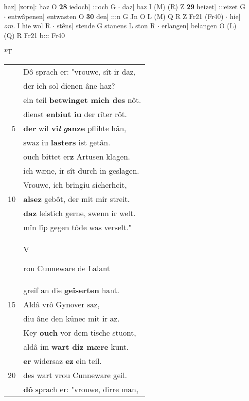 \documentclass[8pt,a4paper,notitlepage]{article}
\begin{document}
\begin{table}[ht]
\begin{minipage}[t]{0.5\linewidth}
haz] [zorn]: haz O \textbf{28} iedoch] :::och G  $\cdot$ daz] baz I (M) (R) Z \textbf{29} heizet] :::eizet G  $\cdot$ entwâpenen] entwasten O \textbf{30} den] :::n G Jn O L (M) Q R Z Fr21 (Fr40)  $\cdot$ hie] \textit{om.} I hie wol R  $\cdot$ stêns] stende G stanens L ston R  $\cdot$ erlangen] belangen O (L) (Q) R Fr21 b::: Fr40 \newline
\end{minipage}
\hspace{0.5cm}
\begin{minipage}[t]{0.5\linewidth}
\small
\begin{center}*T
\end{center}
\begin{tabular}{rl}
 & Dô sprach er: "vrouwe, sît ir daz,\\ 
 & der ich sol dienen âne haz?\\ 
 & ein teil \textbf{betwinget mich des} nôt.\\ 
 & dienst \textbf{enbiut iu} der rîter rôt.\\ 
5 & \textbf{der} wil \textbf{vi\textit{l}} \textbf{\textit{g}anze} pflihte hân,\\ 
 & swaz iu \textbf{lasters} ist getân.\\ 
 & ouch bittet er\textbf{z} Artusen klagen.\\ 
 & ich wæne, ir sît durch in geslagen.\\ 
 & Vrouwe, ich bringiu sicherheit,\\ 
10 & \textbf{alsez} gebôt, der mit mir streit.\\ 
 & \textbf{daz} leistich gerne, swenn ir welt.\\ 
 & mîn lîp gegen tôde was verselt."\\ 
 & \begin{large}V\end{large}rou Cunneware de Lalant\\ 
 & greif an die \textbf{geîserten} hant.\\ 
15 & Aldâ vrô Gynover saz,\\ 
 & diu âne den künec mit ir az.\\ 
 & Key \textbf{ouch} vor dem tische stuont,\\ 
 & aldâ im \textbf{wart diz mære} kunt.\\ 
 & \textbf{er} widersaz \textbf{ez} ein teil.\\ 
20 & des wart vrou Cunneware geil.\\ 
 & \textbf{dô} sprach er: "vrouwe, dirre man,\\ 

\end{tabular}
\end{minipage}
\end{table}
\end{document}
